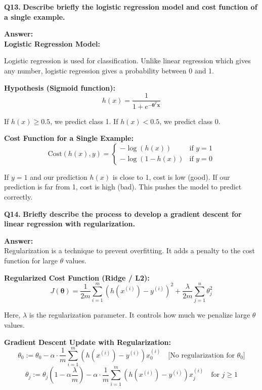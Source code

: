 \documentclass[12pt,a4paper]{article}
\newcommand{\question}[2]{%
    \begin{mdframed}[style=questionstyle]
        \textbf{\textcolor{headerblue}{Q#1.}} \textbf{#2}
    \end{mdframed}%
    \vspace{2pt}%
}
\newcommand{\ans}{\textbf{\textcolor{headerblue}{Answer:}}\\[4pt]}
\newcommand{\subhead}[1]{\textbf{\textcolor{headerblue}{#1}}}
\begin{document}
\vspace{10pt}
\question{13}{Describe briefly the logistic regression model and cost function of a single example.}

\ans

\subhead{Logistic Regression Model:}

Logistic regression is used for classification. Unlike linear regression which gives any number, logistic regression gives a probability between 0 and 1.

\textbf{Hypothesis (Sigmoid function):}
\[
h(x) = \frac{1}{1 + e^{-\boldsymbol{\theta}^T \mathbf{x}}}
\]

If $h(x) \geq 0.5$, we predict class 1. If $h(x) < 0.5$, we predict class 0.

\subhead{Cost Function for a Single Example:}
\[
\text{Cost}(h(x), y) = \begin{cases}
-\log(h(x)) & \text{if } y = 1 \\
-\log(1 - h(x)) & \text{if } y = 0
\end{cases}
\]

If $y = 1$ and our prediction $h(x)$ is close to 1, cost is low (good). If our prediction is far from 1, cost is high (bad). This pushes the model to predict correctly.

\vspace{10pt}
\question{14}{Briefly describe the process to develop a gradient descent for linear regression with regularization.}

\ans

Regularization is a technique to prevent overfitting. It adds a penalty to the cost function for large $\theta$ values.

\subhead{Regularized Cost Function (Ridge / L2):}
\[
J(\boldsymbol{\theta}) = \frac{1}{2m} \sum_{i=1}^{m}\left(h(x^{(i)}) - y^{(i)}\right)^2 + \frac{\lambda}{2m} \sum_{j=1}^{n} \theta_j^2
\]

Here, $\lambda$ is the regularization parameter. It controls how much we penalize large $\theta$ values.

\subhead{Gradient Descent Update with Regularization:}
\[
\theta_0 := \theta_0 - \alpha \cdot \frac{1}{m} \sum_{i=1}^{m}\left(h(x^{(i)}) - y^{(i)}\right) x_0^{(i)} \quad \text{[No regularization for } \theta_0\text{]}
\]
\[
\theta_j := \theta_j \left(1 - \alpha\frac{\lambda}{m}\right) - \alpha \cdot \frac{1}{m} \sum_{i=1}^{m}\left(h(x^{(i)}) - y^{(i)}\right) x_j^{(i)} \quad \text{for } j \geq 1
\]
\end{document}
